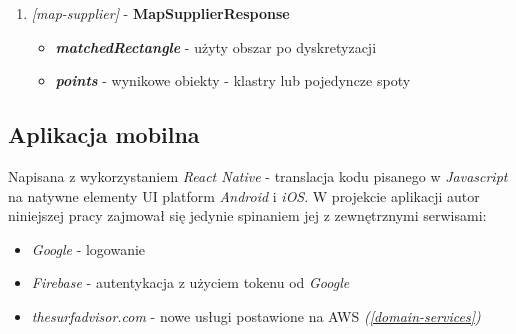 \begin{enumerate}
    \item
    \large\emph{[map-supplier]} - \textbf{MapSupplierResponse}\normalsize
    \begin{itemize}
        \item
        \textbf{\emph{matchedRectangle}} - użyty obszar po dyskretyzacji

        \item
        \textbf{\emph{points}} - wynikowe obiekty - klastry lub pojedyncze spoty

    \end{itemize} 
    
\end{enumerate}

\pagebreak

\subsection{Aplikacja mobilna}

Napisana z wykorzystaniem \emph{React Native} - translacja kodu pisanego w \emph{Javascript} na natywne elementy UI platform \emph{Android} i \emph{iOS}.
W projekcie aplikacji autor niniejszej pracy zajmował się jedynie spinaniem jej z zewnętrznymi serwisami:

\begin{itemize}
    \item
    \emph{Google} - logowanie

    \item
    \emph{Firebase} - autentykacja z użyciem tokenu od \emph{Google}

    \item
    \emph{thesurfadvisor.com} - nowe usługi postawione na AWS \emph{(\ref{domain-services})}

\end{itemize} 

